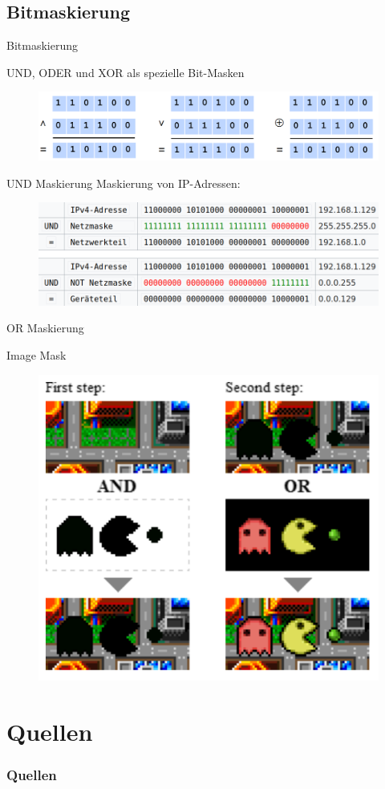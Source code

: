 \documentclass[12pt%
,aspectratio=169%
]{beamer}
\begin{document}
\subsection{Bitmaskierung}
\begin{frame}{Bitmaskierung}
\begin{center}
UND, ODER und XOR als spezielle Bit-Masken
\begin{figure}
\includegraphics[scale=0.35]{pictures/masking}
\end{figure}
\end{center}
\end{frame}

\begin{frame}{UND Maskierung}
Maskierung von IP-Adressen:
\begin{figure}
\includegraphics[scale=0.4]{pictures/UND}
\end{figure}
\end{frame}
\begin{frame}{OR Maskierung}

\begin{center}
Image Mask
\begin{figure}
\includegraphics[scale=0.4]{pictures/OR}
\end{figure}
\end{center}
\end{frame}



\section*{Quellen}
\appendix
\begin{frame}[allowframebreaks]
  \frametitle<presentation>{Quellen}
\printbibliography
\end{frame}
\end{document}
